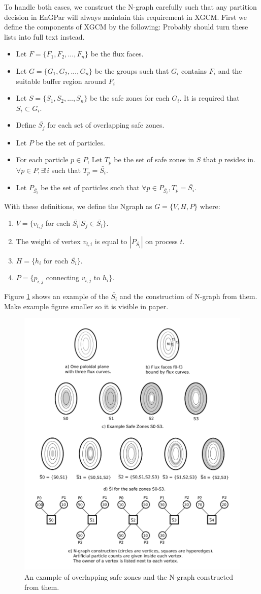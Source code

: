 \documentclass[conference]{IEEEtran}
\begin{document}
To handle both cases, we construct the N-graph carefully such that any partition
decision in EnGPar will always maintain this requirement in XGCM. First we define
the components of XGCM by the following: {\color{red} Probably should turn these lists
  into full text instead.}
\begin{itemize}
\item Let $F = \{F_1,F_2, ..., F_n\}$ be the flux faces.
\item Let $G = \{G_1, G_2, ..., G_n\}$ be the groups such that $G_i$
  contains $F_i$ and the suitable buffer region around $F_i$
\item Let $S = \{S_1,S_2,...,S_n\}$ be the safe zones for each $G_i$.
  It is required that $S_i \subset G_i$.
\item Define $\bar{S_j}$ for each set of overlapping safe zones.
\item Let $P$ be the set of particles.
\item For each particle $p\in P$, Let $T_p$ be the set of safe zones in $S$ that $p$ resides
  in.  $\forall p \in P, \exists ! i$ such that $T_p = \bar{S_i}$.
\item  Let $P_{\bar{S_i}}$ be the set of particles such that $\forall p \in P_{\bar{S_i}}, T_p = \bar{S_i}$.
\end{itemize}

With these definitions, we define the Ngraph as $G = \{V, H, P\}$ where:
\begin{enumerate}
\item $V = \{ v_{i,j}$ for each $\bar{S_i} | S_j \in \bar{S_i} \}$.
\item The weight of vertex $v_{t,i}$ is equal to $|P_{\bar{S_i}}|$ on process $t$.
\item $H = \{ h_i$ for each $\bar{S_i} \}$.
\item $P = \{ p_{i,j}$ connecting $v_{i,j}$ to $h_i \}$.
\end{enumerate}
Figure \ref{fig:sbars} shows an example of the $\bar{S_i}$ and the construction of N-graph from
them. {\color{red} Make example figure smaller so it is visible in paper.}

\begin{figure}[!ht]
  \centering
  \includegraphics[width=.4\textwidth]{../figures/xgcm_ngraph_construction.png}
  \caption{An example of overlapping safe zones and the N-graph constructed from them.}
  \label{fig:sbars}
\end{figure}
\end{document}

